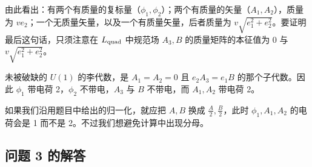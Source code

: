 由此看出：有两个有质量的复标量（$\phi_1,\phi_2$）；两个有质量的矢量（$A_1,A_2$），质量为 $ve_2$；一个无质量矢量，以及一个有质量矢量，后者质量为 $v\sqrt{e_1^2+e_2^2}$。要证明最后这句话，只须注意在 $L_{\rm quad}$ 中规范场 $A_3,B$ 的质量矩阵的本征值为 $0$ 与 $v\sqrt{e_1^2+e_2^2}$。


未被破缺的 $U(1)$ 的李代数，是 $A_1=A_2=0$ 且 $e_2A_3=e_1B$ 的那个子代数。因此 $\phi_1$ 带电荷 2，$\phi_2$ 不带电，$A_3$ 与 $B$ 不带电，而 $A_1,A_2$ 带电荷 2。


\begin{remark*}[Remark]
如果我们沿用题目中给出的归一化，就应把 $A,B$ 换成 $\frac{A}{2},\frac{B}{2}$，此时 $\phi_1,A_1,A_2$ 的电荷会是 1 而不是 2。不过我们想避免计算中出现分母。
\end{remark*}

\subsection*{问题 3 的解答}

